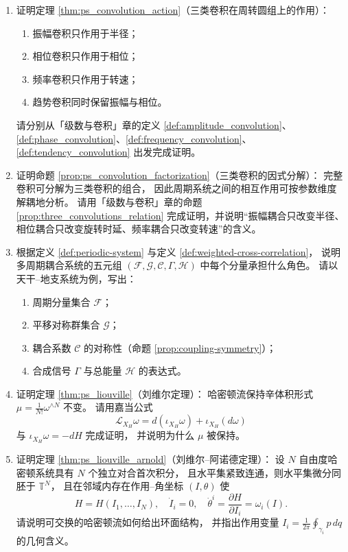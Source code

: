 \begin{enumerate}[leftmargin=3em, label=\textbf{题 \arabic*}]
    \item 证明定理 \ref{thm:ps_convolution_action}（三类卷积在周转圆组上的作用）：
    \begin{enumerate}[label=(\roman*)]
        \item 振幅卷积只作用于半径；
        \item 相位卷积只作用于相位；
        \item 频率卷积只作用于转速；
        \item 趋势卷积同时保留振幅与相位。
    \end{enumerate}
    请分别从「级数与卷积」章的定义 \ref{def:amplitude_convolution}、
    \ref{def:phase_convolution}、\ref{def:frequency_convolution}、
    \ref{def:tendency_convolution} 出发完成证明。

    \item 证明命题 \ref{prop:ps_convolution_factorization}（三类卷积的因式分解）：
    完整卷积可分解为三类卷积的组合，
    因此周期系统之间的相互作用可按参数维度解耦地分析。
    请用「级数与卷积」章的命题 \ref{prop:three_convolutions_relation}
    完成证明，并说明“振幅耦合只改变半径、
    相位耦合只改变旋转时延、频率耦合只改变转速”的含义。

    \item 根据定义 \ref{def:periodic-system} 与定义 \ref{def:weighted-cross-correlation}，
    说明多周期耦合系统的五元组 $(\mathcal{F},\mathcal{G},\mathcal{C},\Gamma,\mathcal{H})$
    中每个分量承担什么角色。
    请以天干--地支系统为例，写出：
    \begin{enumerate}[label=(\roman*)]
        \item 周期分量集合 $\mathcal{F}$；
        \item 平移对称群集合 $\mathcal{G}$；
        \item 耦合系数 $\mathcal{C}$ 的对称性（命题 \ref{prop:coupling-symmetry}）；
        \item 合成信号 $\Gamma$ 与总能量 $\mathcal{H}$ 的表达式。
    \end{enumerate}

    \item 证明定理 \ref{thm:ps_liouville}（刘维尔定理）：
    哈密顿流保持辛体积形式 $\mu=\frac1{N!}\omega^{\wedge N}$ 不变。
    请用嘉当公式
    \[
    \mathcal{L}_{X_H}\omega=d(\iota_{X_H}\omega)+\iota_{X_H}(d\omega)
    \]
    与 $\iota_{X_H}\omega=-dH$ 完成证明，
    并说明为什么 $\mu$ 被保持。

    \item 证明定理 \ref{thm:ps_liouville_arnold}（刘维尔--阿诺德定理）：
    设 $N$ 自由度哈密顿系统具有 $N$ 个独立对合首次积分，
    且水平集紧致连通，则水平集微分同胚于 $\mathbb{T}^N$，
    且在邻域内存在作用--角坐标 $(I,\theta)$ 使
    \[
    H=H(I_1,\dots,I_N),\quad
    \dot{I}_i=0,\quad
    \dot{\theta}^i=\frac{\partial H}{\partial I_i}=\omega_i(I).
    \]
    请说明可交换的哈密顿流如何给出环面结构，
    并指出作用变量 $I_i=\frac1{2\pi}\oint_{\gamma_i}p\,dq$ 的几何含义。


\end{enumerate}
